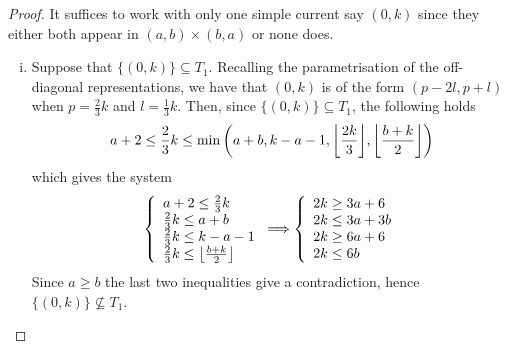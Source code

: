 \documentclass[a4paper,11pt]{article}
\DeclarePairedDelimiter\floor{\lfloor}{\rfloor}
\theoremstyle{plain}
\theoremstyle{definition}
\begin{document}
\begin{proof}
    It suffices to work with only one simple current say $(0,k)$ since they either both appear in $(a,b)\times (b,a)$ or none does. 
    \begin{enumerate}[i),wide, labelwidth=!, labelindent=0pt]
\item Suppose that $\{(0,k)\}\subseteq T_1$. Recalling the parametrisation of the off-diagonal representations, we have that $(0,k)$ is of the form $(p-2l,p+l)$ when $p=\frac{2}{3}k$ and $l=\frac{1}{3}k$. Then, since $\{(0,k)\}\subseteq T_1$, the following holds
\begin{equation}
    a+2 \leq \frac{2}{3}k \leq  \operatorname{min}\left(a+b,k-a-1,\floor*{\frac{2k}{3}},\floor*{\frac{b+k}{2}}\right)
\end{equation}
which gives the system
 \begin{equation}
         \left\{\begin{array}{lr}
     a+2\leq \frac{2}{3}k \\
        \frac{2}{3}k\leq a+b \\
        \frac{2}{3}k \leq k-a-1 \\
         \frac{2}{3}k\leq \floor*{\frac{b+k}{2}}
        \end{array}\right. 
 \Longrightarrow    \left\{\begin{array}{lr}
     2k\geq 3a+6 \\
        2k\leq 3a+3b \\
        2k \geq  6a+6 \\
         2k\leq 6b
        \end{array}\right. 
    \end{equation}
    Since $a\geq b$ the last two inequalities give a contradiction, hence $\{(0,k)\}\nsubseteq T_1$.
    

\end{enumerate}
\end{proof}
\end{document}
